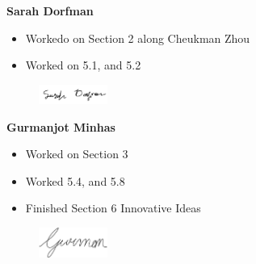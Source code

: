 \textbf{Sarah Dorfman}
\begin{itemize}
    \item Workedo on Section 2 along Cheukman Zhou
    \item Worked on 5.1, and 5.2
\end{itemize}
\begin{figure}[H]
	\includegraphics[width=0.2\textwidth]{Signatures/s.png}
\end{figure}


\textbf{Gurmanjot Minhas}
\begin{itemize}
    \item Worked on Section 3
    \item Worked 5.4, and 5.8
    \item Finished Section 6 Innovative Ideas
\end{itemize}
\begin{figure}[H]
	\includegraphics[width=0.2\textwidth]{Signatures/g.png}
\end{figure}

